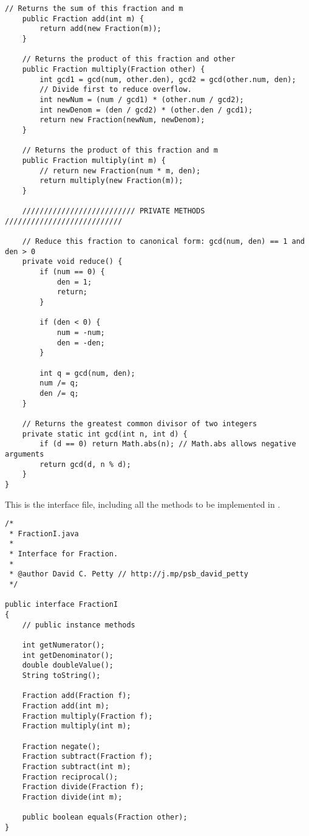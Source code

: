 \documentclass[11pt]{article}%
\begin{document}
\begin{lstlisting}[caption=\code{Fraction.java},label=Fraction]
    // Returns the sum of this fraction and m
    public Fraction add(int m) {
        return add(new Fraction(m));
    }

    // Returns the product of this fraction and other
    public Fraction multiply(Fraction other) {
        int gcd1 = gcd(num, other.den), gcd2 = gcd(other.num, den);
        // Divide first to reduce overflow.
        int newNum = (num / gcd1) * (other.num / gcd2);
        int newDenom = (den / gcd2) * (other.den / gcd1);
        return new Fraction(newNum, newDenom);
    }

    // Returns the product of this fraction and m
    public Fraction multiply(int m) {
        // return new Fraction(num * m, den);
        return multiply(new Fraction(m));
    }

    ////////////////////////// PRIVATE METHODS ///////////////////////////

    // Reduce this fraction to canonical form: gcd(num, den) == 1 and den > 0
    private void reduce() {
        if (num == 0) {
            den = 1;
            return;
        }
        
        if (den < 0) {
            num = -num;
            den = -den;
        }
        
        int q = gcd(num, den);
        num /= q;
        den /= q;
    }

    // Returns the greatest common divisor of two integers
    private static int gcd(int n, int d) {
        if (d == 0) return Math.abs(n); // Math.abs allows negative arguments
        return gcd(d, n % d);
    }
}\end{lstlisting}

This is the  interface file, including all the methods to be implemented in . \\

\begin{lstlisting}[caption=\code{\href{http://pastebin.com/ZDCKReZR}{FractionI.java}},label=FractionI]
/*
 * FractionI.java
 *
 * Interface for Fraction.
 *
 * @author David C. Petty // http://j.mp/psb_david_petty
 */

public interface FractionI
{ 
    // public instance methods

    int getNumerator();
    int getDenominator();
    double doubleValue();
    String toString();

    Fraction add(Fraction f);
    Fraction add(int m);
    Fraction multiply(Fraction f);
    Fraction multiply(int m);

    Fraction negate();
    Fraction subtract(Fraction f);
    Fraction subtract(int m);
    Fraction reciprocal();
    Fraction divide(Fraction f);
    Fraction divide(int m);

    public boolean equals(Fraction other);
}
\end{lstlisting}



\printindex %
\end{document}
